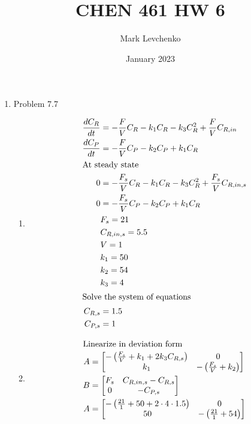 \documentclass[12pt]{article}
\title{CHEN 461 HW 6}
\author{Mark Levchenko}
\date{January 2023}
\begin{document}
\begin{enumerate}

\newpage
\item Problem 7.7
\begin{enumerate}
    \item 
    \begin{align*}
        \frac{dC_R}{dt} &= -\frac{F}{V} C_R - k_1 C_R - k_3 C_R^2 + \frac{F}{V} C_{R,in} \\
        \frac{dC_P}{dt} &= -\frac{F}{V} C_P - k_2 C_P + k_1 C_R \\
        \intertext{At steady state}
        0 &= -\frac{F_s}{V} C_R - k_1 C_R - k_3 C_R^2 + \frac{F_s}{V} C_{R,in,s} \\
        0 &= -\frac{F_s}{V} C_P - k_2 C_P + k_1 C_R \\
        & F_s = 21 \\
        & C_{R,in,s} = 5.5 \\
        & V = 1 \\
        & k_1 = 50 \\
        & k_2 = 54 \\
        & k_3 = 4 \\
        \intertext{Solve the system of equations}
        C_{R,s} &= 1.5 \\
        C_{P,s} &= 1
    \end{align*}
    \item 
    \begin{align*}
        \intertext{Linearize in deviation form}
        A &= \begin{bmatrix}
            -\left(\frac{F_s}{V} + k_1 + 2 k_3 C_{R,s}\right) & 0 \\
            k_1 & -\left(\frac{F_s}{V} + k_2\right) \\
        \end{bmatrix} \\
        B &= \begin{bmatrix}
            F_s & C_{R,in,s} - C_{R,s} \\
            0 & -C_{P,s} \\
        \end{bmatrix} \\
        A &= \begin{bmatrix}
            -\left(\frac{21}{1} + 50 + 2 \cdot 4  \cdot 1.5 \right) & 0 \\
            50 & -\left(\frac{21}{1} + 54\right) \\

\end{bmatrix}
\end{align*}
\end{enumerate}
\end{enumerate}
\end{document}
